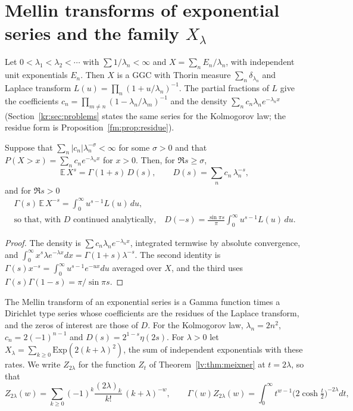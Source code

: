 \section{Mellin transforms of exponential series and the family $X_\lambda$}\label{ml:sec:family}
Let $0<\lambda_1<\lambda_2<\cdots$ with $\sum1/\lambda_n<\infty$ and $X=\sum_nE_n/\lambda_n$, with independent unit exponentials $E_n$. Then $X$ is a GGC with Thorin measure $\sum_n\delta_{\lambda_n}$ and Laplace transform $L(u)=\prod_n(1+u/\lambda_n)^{-1}$. The partial fractions of $L$ give the coefficients $c_n=\prod_{m\ne n}(1-\lambda_n/\lambda_m)^{-1}$ and the density $\sum_nc_n\lambda_ne^{-\lambda_nx}$ (Section~\ref{kr:sec:problems} states the same series for the Kolmogorov law; the residue form is Proposition~\ref{fm:prop:residue}).
\begin{theorem}\label{ml:thm:mellin}
Suppose that $\sum_n|c_n|\lambda_n^{-\sigma}<\infty$ for some $\sigma>0$ and that $P(X>x)=\sum_nc_ne^{-\lambda_nx}$ for $x>0$. Then, for $\Re s\ge\sigma$,
\[
\mathbb E\,X^{s}=\Gamma(1+s)\,D(s),\qquad D(s)=\sum_nc_n\,\lambda_n^{-s},
\]
and for $\Re s>0$
\[
\begin{gathered}\Gamma(s)\,\mathbb E\,X^{-s}=\int_0^\infty u^{s-1}L(u)\,du,\\ \text{so that, with $D$ continued analytically,}\quad D(-s)=\frac{\sin\pi s}{\pi}\int_0^\infty u^{s-1}L(u)\,du .\end{gathered}
\]
\end{theorem}
\begin{proof}
The density is $\sum c_n\lambda_ne^{-\lambda_nx}$, integrated termwise by absolute convergence, and $\int_0^\infty x^s\lambda e^{-\lambda x}dx=\Gamma(1+s)\lambda^{-s}$. The second identity is $\Gamma(s)x^{-s}=\int_0^\infty u^{s-1}e^{-ux}du$ averaged over $X$, and the third uses $\Gamma(s)\Gamma(1-s)=\pi/\sin\pi s$.
\end{proof}
The Mellin transform of an exponential series is a Gamma function times a Dirichlet type series whose coefficients are the residues of the Laplace transform, and the zeros of interest are those of $D$. For the Kolmogorov law, $\lambda_n=2n^2$, $c_n=2(-1)^{n-1}$ and $D(s)=2^{1-s}\eta(2s)$.
For $\lambda>0$ let $X_\lambda=\sum_{k\ge0}\mathrm{Exp}(2(k+\lambda)^2)$, the sum of independent exponentials with these rates. We write $Z_{2\lambda}$ for the function $Z_t$ of Theorem~\ref{lv:thm:meixner} at $t=2\lambda$, so that
\[
Z_{2\lambda}(w)=\sum_{k\ge0}(-1)^k\frac{(2\lambda)_k}{k!}\,(k+\lambda)^{-w},\qquad \Gamma(w)Z_{2\lambda}(w)=\int_0^\infty t^{w-1}\big(2\cosh\tfrac t2\big)^{-2\lambda}dt,
\]
